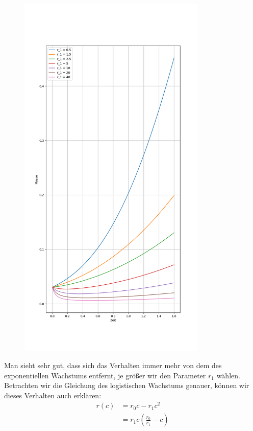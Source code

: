 \begin{figure}[H]
	\label{vergleichsplot}
	\centering
    \includegraphics[width=0.80\textwidth]{../Aufgabe30/vergleichsplot.png}
\end{figure}
Man sieht sehr gut, dass sich das Verhalten immer mehr von dem des exponentiellen Wachstums entfernt, je größer wir den Parameter $r_1$ wählen.  
Betrachten wir die Gleichung des logistischen Wachstums genauer, können wir dieses Verhalten auch erklären:
\begin{align*}
	r(c) &= r_0 c - r_1 c^2 \\
	&=r_1c(\frac{r_0}{r_1}-c)
\end{align*}

